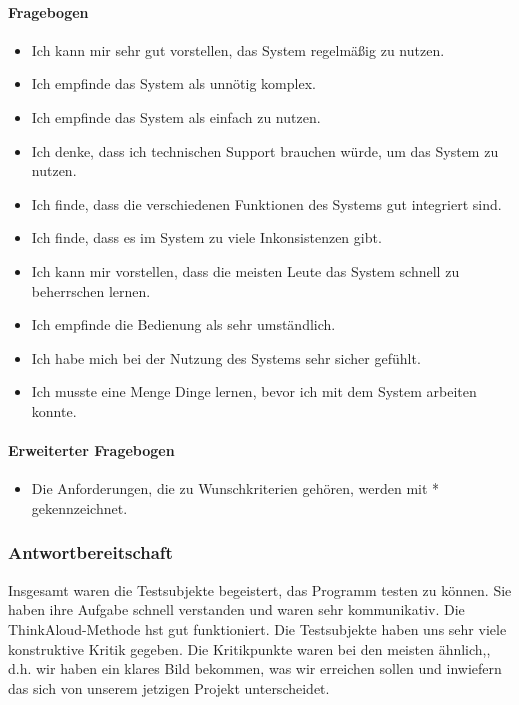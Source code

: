 \paragraph{Fragebogen}
\begin{itemize}
  \item  Ich kann mir sehr gut vorstellen, das System regelmäßig zu nutzen.
  \item   Ich empfinde das System als unnötig komplex.
  \item Ich empfinde das System als einfach zu nutzen.
  \item   Ich denke, dass ich technischen Support brauchen würde, um das System zu nutzen.
   \item Ich finde, dass die verschiedenen Funktionen des Systems gut integriert sind.
   \item Ich finde, dass es im System zu viele Inkonsistenzen gibt.
   \item  Ich kann mir vorstellen, dass die meisten Leute das System schnell zu beherrschen lernen.
   \item Ich empfinde die Bedienung als sehr umständlich.
   \item  Ich habe mich bei der Nutzung des Systems sehr sicher gefühlt.
   \item Ich musste eine Menge Dinge lernen, bevor ich mit dem System arbeiten konnte.
\end{itemize}
\paragraph{Erweiterter Fragebogen}
\begin{itemize}
  \item Die Anforderungen, die zu Wunschkriterien gehören, werden mit * gekennzeichnet.
\end{itemize}
\subsubsection{Antwortbereitschaft}
     
     Insgesamt waren die Testsubjekte begeistert, das Programm testen zu können. Sie haben ihre Aufgabe schnell verstanden und waren sehr kommunikativ. Die ThinkAloud-Methode hst gut funktioniert. Die Testsubjekte haben uns sehr viele konstruktive Kritik gegeben. Die Kritikpunkte waren bei den meisten ähnlich,, d.h. wir haben ein klares Bild bekommen, was wir erreichen sollen und inwiefern das sich von unserem jetzigen Projekt unterscheidet.


